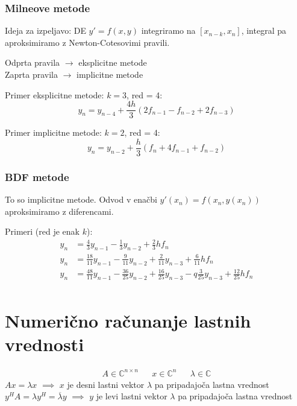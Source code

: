 \begin{multicols}{5}
\subsubsection*{Milneove metode}
Ideja za izpeljavo: DE $y' = f(x,y)$ integriramo na $[x_{n-k}, x_n]$, integral pa aproksimiramo z Newton-Cotesovimi pravili.

Odprta pravila $\rightarrow$ eksplicitne metode \\
Zaprta pravila $\rightarrow$ implicitne metode 

Primer eksplicitne metode: $k = 3$, red = 4:
\[ y_n = y_{n-4} + \frac{4h}{3} (2f_{n-1} - f_{n-2} + 2f_{n-3}) \]

Primer implicitne metode: $k = 2$, red = 4:
\[ y_n = y_{n-2} + \frac{h}{3} (f_{n} + 4f_{n-1} + f_{n-2}) \]

\subsubsection*{BDF metode}
To so implicitne metode. Odvod v enačbi $y'(x_n) = f(x_n, y(x_n))$ aproksimiramo z diferencami.

Primeri (red je enak $k$):
\begin{align*}
    y_n &= \frac{4}{3} y_{n-1} - \frac{1}{3} y_{n-2} + \frac{2}{3}h f_n \\
    y_n &= \frac{18}{11} y_{n-1} - \frac{9}{11} y_{n-2} + \frac{2}{11} y_{n-3} + \frac{6}{11} h f_n \\
    y_n &= \frac{48}{11} y_{n-1} - \frac{36}{25} y_{n-2} + \frac{16}{25} y_{n-3} -q  \frac{3}{25} y_{n-3} + \frac{12}{25} h f_n \\
\end{align*}

\section*{Numerično računanje lastnih vrednosti}
\begin{align*}
    A \in \mathbb{C}^{n\times n} && x \in \mathbb{C}^n && \lambda \in \mathbb{C}
\end{align*}
$Ax = \lambda x$ $\implies$ $x$ je desni lastni vektor $\lambda$ pa pripadajoča lastna vrednost\\
$y^HA = \lambda y^H = \overline{\lambda} y$ $\implies$ $y$  je levi lastni vektor $\lambda$ pa pripadajoča lastna vrednost


\end{multicols}
